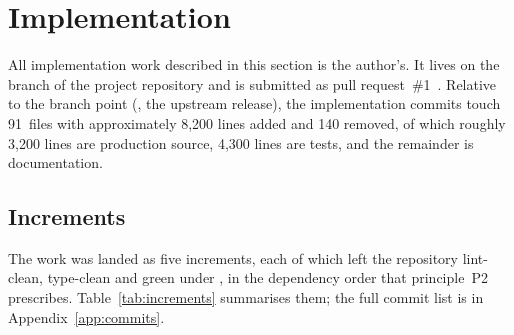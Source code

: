 \section{Implementation}
\label{sec:implementation}

All implementation work described in this section is the author's. It lives on the branch
 of the project repository and is submitted as
pull request~\#1~\cite{tap-pr1}. Relative to the branch point (, the
upstream  release), the implementation commits touch 91~files with
approximately 8{,}200 lines added and 140 removed, of which roughly 3{,}200 lines are
production source, 4{,}300 lines are tests, and the remainder is documentation.

\subsection{Increments}

The work was landed as five increments, each of which left the repository lint-clean,
type-clean and green under , in the dependency order that principle~P2
prescribes. Table~\ref{tab:increments} summarises them; the full commit list is in
Appendix~\ref{app:commits}.

